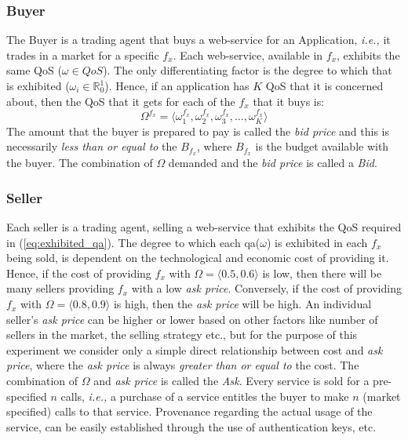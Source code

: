 \documentclass[10pt,journal,compsoc]{IEEEtran}
\begin{document}
\subsubsection{Buyer}
The Buyer is a trading agent that buys a web-service for an Application, \textit{i.e.,} it trades in a market for a specific $f_x$. Each web-service, available in $f_x$, exhibits the same QoS ($\omega \in QoS$). The only differentiating factor is the degree to which that is exhibited  ($ \omega_{i} \in \mathbb{R}_{0}^{1} $). Hence, if an application has $K$ QoS that it is concerned about, then the QoS that it gets for each of the $f_{x}$ that it buys is:
	 \begin{equation}
	  \Omega^{f_{x}} = \langle \omega_{1}^{f_x}, \omega_{2}^{f_x}, \omega_{3}^{f_x}, \ldots, \omega_{K}^{f_x} \rangle \label{eq:exhibited_qa}
	 \end{equation}
The amount that the buyer is prepared to pay is called the \textsl{bid price} and this is necessarily \textit{less than or equal to} the $B_{f_x}$, where $B_{f_x}$ is the budget available with the buyer. The combination of $\Omega$ demanded and the \textsl{bid price} is called a \textsl{Bid}.

\subsubsection{Seller}
Each seller is a trading agent, selling a web-service that exhibits the QoS required in (\ref{eq:exhibited_qa}). The degree to which each qa($\omega$) is exhibited in each $f_x$ being sold, is dependent on the technological and economic cost of providing it. Hence, if the cost of providing $f_x$ with $\Omega = \langle 0.5, 0.6 \rangle$ is low, then there will be many sellers providing $f_x$ with a low \textsl{ask price}. Conversely, if the cost of providing $f_x$ with $\Omega = \langle 0.8, 0.9 \rangle$ is high, then the \textsl{ask price} will be high. An individual seller's \textsl{ask price} can be higher or lower based on other factors like number of sellers in the market, the selling strategy etc., but for the purpose of this experiment we consider only a simple direct relationship between cost and \textsl{ask price}, where the \textsl{ask price} is always \textit{greater than or equal to} the cost. The combination of $\Omega$ and \textsl{ask price} is called the \textsl{Ask}. Every service is sold for a pre-specified $n$ calls, \textit{i.e.,} a purchase of a service entitles the buyer to make $n$ (market specified) calls to that service. Provenance regarding the actual usage of the service, can be easily established through the use of authentication keys, etc. 
\end{document}
